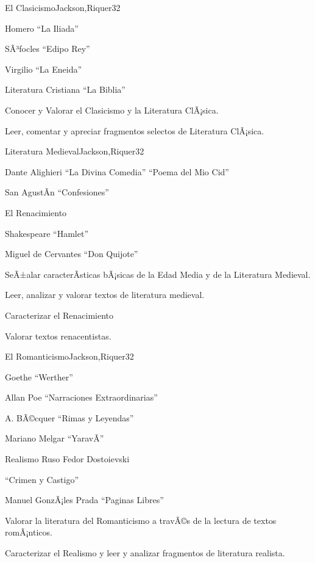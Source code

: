 \begin{syllabus}
\begin{unit}{El Clasicismo}{Jackson,Riquer}{3}{2}
\begin{topics}
	\item Homero ``La Iliada''
	\item SÃ³focles ``Edipo Rey''
	\item Virgilio ``La Eneida''
	\item Literatura Cristiana ``La Biblia''
\end{topics}
\begin{unitgoals}
	\item Conocer y Valorar el Clasicismo y la Literatura ClÃ¡sica.
	\item Leer, comentar y apreciar fragmentos selectos de Literatura ClÃ¡sica.
\end{unitgoals}
\end{unit}
\begin{unit}{Literatura Medieval}{Jackson,Riquer}{3}{2}
\begin{topics}
	\item Dante Alighieri ``La Divina Comedia'' ``Poema del Mio Cid''
	\item    San AgustÃ­n ``Confesiones''  
	\item    El Renacimiento
	\item    Shakespeare ``Hamlet''
	\item    Miguel de Cervantes ``Don Quijote''
\end{topics}
\begin{unitgoals}
	\item SeÃ±alar caracterÃ­sticas bÃ¡sicas de la Edad Media y de la Literatura Medieval.
	\item Leer, analizar y valorar textos de literatura medieval.
	\item Caracterizar el Renacimiento
	\item Valorar textos renacentistas.
\end{unitgoals}
\end{unit}

\begin{unit}{El Romanticismo}{Jackson,Riquer}{3}{2}
\begin{topics}
	\item Goethe ``Werther''
	\item Allan Poe ``Narraciones Extraordinarias''
	\item A. BÃ©cquer ``Rimas y Leyendas''
	\item Mariano Melgar ``YaravÃ­''
	\item Realismo Ruso Fedor Dostoievski 
	\item ``Crimen y Castigo''
	\item Manuel GonzÃ¡les Prada ``Paginas Libres''
\end{topics}
\begin{unitgoals}
	\item Valorar la literatura del Romanticismo a travÃ©s de la lectura de textos romÃ¡nticos.
	\item Caracterizar el Realismo y leer y analizar fragmentos de literatura realista.
\end{unitgoals}
\end{unit}


\end{syllabus}
